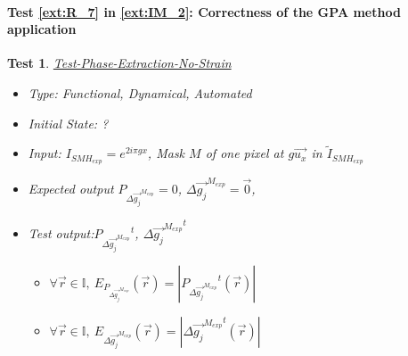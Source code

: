 \documentclass[12pt, titlepage]{article}
\newtheorem{Test}{Test}
\begin{document}
\paragraph{Test \cref{ext:R_7} in \cref{ext:IM_2}: Correctness of the GPA method application} 

\begin{Test}\normalfont\underline{Test-Phase-Extraction-No-Strain}
\label{T_Phase-Extraction-No-Strain}
\begin{itemize}
\item Type: Functional, Dynamical, Automated
\item Initial State: ?
\item Input: $I_{SMH_{exp}}=e^{2i\pi gx}$, Mask $M$ of one pixel at $g\overrightarrow{u_x}$ in $\widetilde{I}_{SMH_{exp}}$
\item Expected output $P_{\Delta \overrightarrow{g_{j}}^{M_{exp}}}=0$, $\Delta \overrightarrow{g_{j}}^{M_{exp}}=\overrightarrow{0}$, 
\item Test output:${P_{\Delta \overrightarrow{g_{j}}^{M_{exp}}}}^{t}$, $\Delta {\overrightarrow{g_{j}}^{M_{exp}}}^{t}$
	\begin{itemize}
	\item $\forall \vec{r} \in \mathbb{I}, \ E_{P_{\Delta \overrightarrow{g_{j}}^{M_{exp}}}}(\vec{r})=|{P_{\Delta \overrightarrow{g_{j}}^{M_{exp}}}}^{t}(\vec{r})|$
	\item $\forall \vec{r} \in \mathbb{I}, \ E_{\Delta {\overrightarrow{g_{j}}^{M_{exp}}}}(\vec{r})=|{\Delta {\overrightarrow{g_{j}}^{M_{exp}}}}^t(\vec{r})|$
	\end{itemize}  
\end{itemize}
\end{Test}
\end{document}
